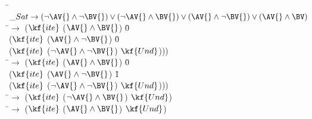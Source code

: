 \begin{subfigure}[t]{\textwidth}
  \begin{tabbing}
  \qquad \= $\_Sat \rightarrow (\neg \AV{} \wedge \neg \BV{}) \vee (\neg \AV{} \wedge \BV{}) \vee (\AV{} \wedge \neg \BV{}) \vee (\AV{} \wedge \BV)$ \\
  \> \iV{}\quad\hspace{1.7ex}\=$\rightarrow$ ($\kf{ite}$ ($\AV{} \wedge \BV{}$)\; \=0 \\
  \> \> \> ($\kf{ite}$\; ($\AV{} \wedge \neg \BV{}$)\; \=0 \\
  \> \> \> \> ($\kf{ite}$\; ($\neg \AV{} \wedge \neg \BV{}$) $\kf{Und}$))) \\

  \> \cV{}\quad\hspace{1.7ex}\=$\rightarrow$ ($\kf{ite}$ ($\AV{} \wedge \BV{}$)\; \=0 \\
  \> \> \> ($\kf{ite}$\; ($\AV{} \wedge \neg \BV{}$)\; \=1 \\
  \> \> \> \> ($\kf{ite}$\; ($\neg \AV{} \wedge \neg \BV{}$) $\kf{Und}$))) \\

  \> \aV{}\quad\hspace{1.7ex}\=$\rightarrow$ ($\kf{ite}$ ($\neg \AV{} \wedge \BV{}$)\; \tru{} $\kf{Und}$)\\
  \> \bV{}\quad\hspace{1.7ex}\=$\rightarrow$ ($\kf{ite}$ ($\AV{} \wedge \BV{}$) $\kf{Und}$)
\end{tabbing}
\end{subfigure}
